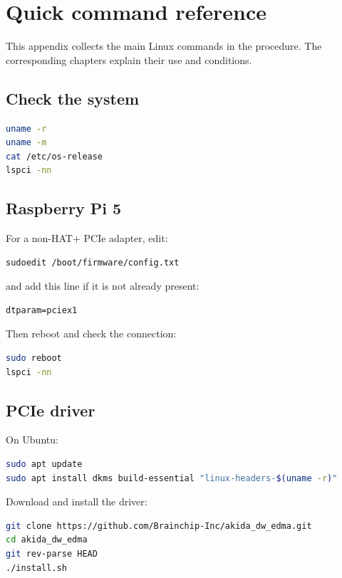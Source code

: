 \chapter{Quick command reference}
\label{app:comandos}

This appendix collects the main Linux commands in the procedure. The corresponding
chapters explain their use and conditions.

\section{Check the system}

\begin{lstlisting}[language=bash]
uname -r
uname -m
cat /etc/os-release
lspci -nn
\end{lstlisting}

\section{Raspberry Pi 5}

For a non-HAT+ PCIe adapter, edit:

\begin{lstlisting}[language=bash]
sudoedit /boot/firmware/config.txt
\end{lstlisting}

and add this line if it is not already present:

\begin{lstlisting}
dtparam=pciex1
\end{lstlisting}

Then reboot and check the connection:

\begin{lstlisting}[language=bash]
sudo reboot
lspci -nn
\end{lstlisting}

\section{PCIe driver}

On Ubuntu:

\begin{lstlisting}[language=bash]
sudo apt update
sudo apt install dkms build-essential "linux-headers-$(uname -r)"
\end{lstlisting}

Download and install the driver:

\begin{lstlisting}[language=bash]
git clone https://github.com/Brainchip-Inc/akida_dw_edma.git
cd akida_dw_edma
git rev-parse HEAD
./install.sh
\end{lstlisting}

